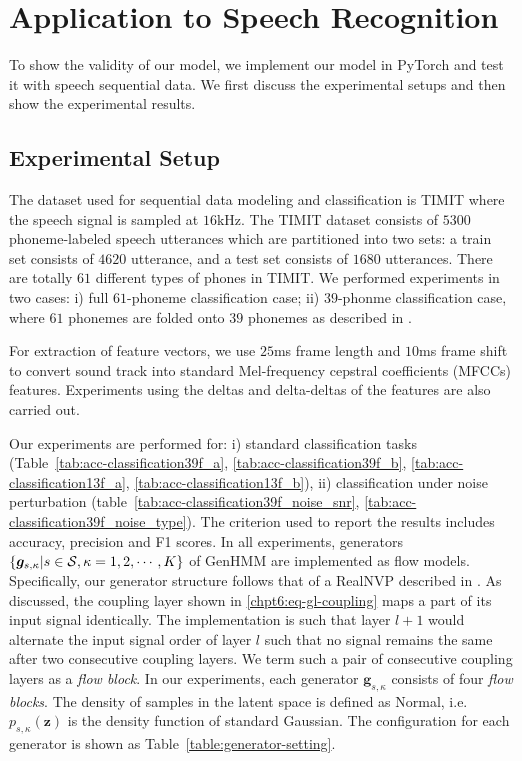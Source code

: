 \section{Application to Speech Recognition}
To show the validity of our model, we implement our model in PyTorch and test it with speech sequential data. We first discuss the experimental setups and then show the experimental results. 

\subsection{Experimental Setup}
The dataset used for sequential data modeling and classification is TIMIT where the speech signal is sampled at $16$kHz.
The TIMIT dataset consists of $5300$ phoneme-labeled speech utterances which are partitioned into two sets: {a train set consists of $4620$ utterance, and a test set consists of $1680$ utterances.} There are totally $61$ different types of phones in TIMIT.
We performed experiments in two cases: i) full $61$-phoneme classification case; ii) $39$-phonme classification case, where $61$ phonemes are folded onto $39$ phonemes as described in \cite{Perdigao11}.

For extraction of feature vectors, we use $25$ms frame length and $10$ms frame shift to convert sound track into standard Mel-frequency cepstral coefficients (MFCCs) features. Experiments using the deltas and delta-deltas of the features are also carried out.


Our experiments are performed for: i) standard classification tasks (Table~\ref{tab:acc-classification39f_a}, \ref{tab:acc-classification39f_b}, \ref{tab:acc-classification13f_a}, \ref{tab:acc-classification13f_b}), ii) classification under noise perturbation (table~\ref{tab:acc-classification39f_noise_snr}, \ref{tab:acc-classification39f_noise_type}). The criterion used to report the results includes accuracy, precision and F1 scores.
In all experiments, generators $\left\{\bm{g}_{s,\kappa}|s\in \mathcal{S}, \kappa=1, 2, \cdots, K \right\}$ of GenHMM are implemented as flow models. Specifically, our generator structure follows that of a RealNVP described in \cite{2016arXiv160508803D}.
As discussed, the coupling layer shown in \eqref{chpt6:eq-gl-coupling} maps a part of its input signal identically.
The implementation is such that layer $l+1$ would alternate the input signal order of layer $l$ such that no signal remains the same after two consecutive coupling layers.
We term such a pair of consecutive coupling layers as a \textit{flow block}.
In our experiments, each generator $\bm{g}_{s,\kappa}$ consists of four \textit{flow blocks}.
The density of samples in the latent space is defined as Normal,
i.e. $p_{s,\kappa}(\bm{z})$ is the density function of standard
Gaussian. The configuration for each generator is shown as Table~\ref{table:generator-setting}.

